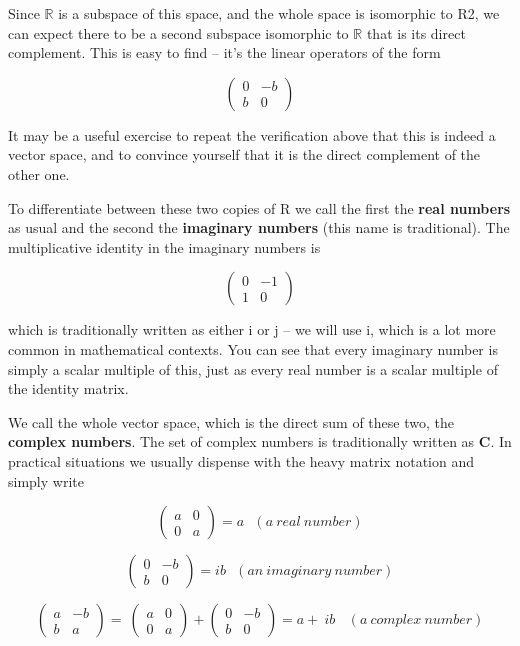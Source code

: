 \documentclass[oneside,english]{amsbook}
\numberwithin{section}{chapter}
\theoremstyle{plain}
\theoremstyle{definition}
\begin{document}
Since $\mathbb{R}$ is a subspace of this space, and the whole space is
isomorphic to R2, we can expect there to be a second subspace isomorphic
to $\mathbb{R}$ that is its direct complement. This is easy to find --
it's the linear operators of the form

\[\begin{pmatrix}
	0 & - b \\
	b & 0
\end{pmatrix}\]

It may be a useful exercise to repeat the verification above that this
is indeed a vector space, and to convince yourself that it is the direct
complement of the other one.

To differentiate between these two copies of R we call the first the
\textbf{real numbers} as usual and the second the \textbf{imaginary
	numbers} (this name is traditional). The multiplicative identity in the
imaginary numbers is

\[\begin{pmatrix}
	0 & - 1 \\
	1 & 0
\end{pmatrix}\]

which is traditionally written as either i or j -- we will use i, which
is a lot more common in mathematical contexts. You can see that every
imaginary number is simply a scalar multiple of this, just as every real
number is a scalar multiple of the identity matrix.

We call the whole vector space, which is the direct sum of these two,
the \textbf{complex numbers}. The set of complex numbers is
traditionally written as \textbf{C}. In practical situations we usually
dispense with the heavy matrix notation and simply write

\[\begin{pmatrix}
	a & 0 \\
	0 & a
\end{pmatrix} = a\ \ \ (a\ real\ number)\]

\[\begin{pmatrix}
	0 & - b \\
	b & 0
\end{pmatrix} = ib\ \ \ (an\ imaginary\ number)\]

\[\begin{pmatrix}
	a & - b \\
	b & a
\end{pmatrix} = \ \begin{pmatrix}
	a & 0 \\
	0 & a
\end{pmatrix} + \begin{pmatrix}
	0 & - b \\
	b & 0
\end{pmatrix} = a + \ ib\ \ \ \ (a\ complex\ number)\]
\end{document}
